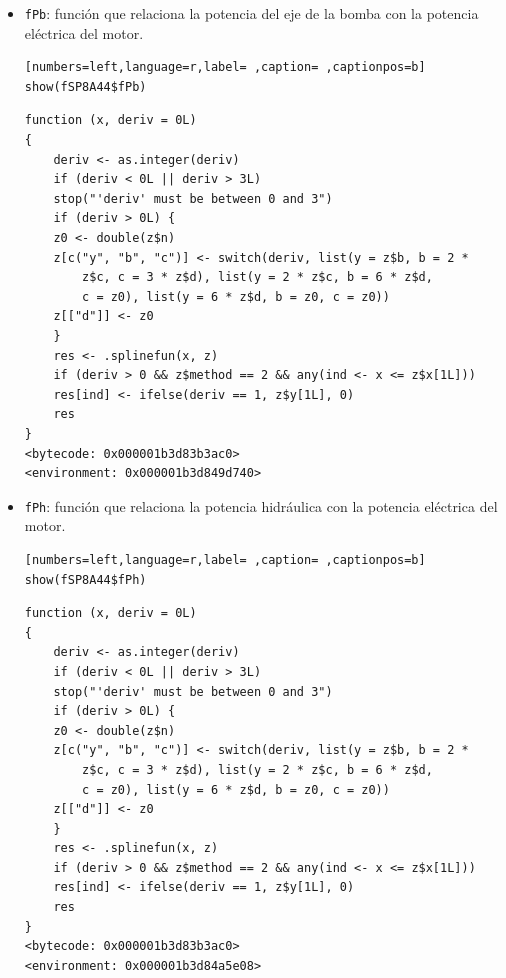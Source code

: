 \begin{itemize}
\begin{itemize}
\begin{verbatim}
function (x, deriv = 0L) 
{
    deriv <- as.integer(deriv)
    if (deriv < 0L || deriv > 3L) 
	stop("'deriv' must be between 0 and 3")
    if (deriv > 0L) {
	z0 <- double(z$n)
	z[c("y", "b", "c")] <- switch(deriv, list(y = z$b, b = 2 * 
	    z$c, c = 3 * z$d), list(y = 2 * z$c, b = 6 * z$d, 
	    c = z0), list(y = 6 * z$d, b = z0, c = z0))
	z[["d"]] <- z0
    }
    res <- .splinefun(x, z)
    if (deriv > 0 && z$method == 2 && any(ind <- x <= z$x[1L])) 
	res[ind] <- ifelse(deriv == 1, z$y[1L], 0)
    res
}
<bytecode: 0x000001b3d83b3ac0>
<environment: 0x000001b3d83be0b8>
\end{verbatim}

\item \texttt{fPb}: función que relaciona la potencia del eje de la bomba con la potencia eléctrica del motor.
\begin{lstlisting}[numbers=left,language=r,label= ,caption= ,captionpos=b]
show(fSP8A44$fPb)
\end{lstlisting}

\begin{verbatim}
function (x, deriv = 0L) 
{
    deriv <- as.integer(deriv)
    if (deriv < 0L || deriv > 3L) 
	stop("'deriv' must be between 0 and 3")
    if (deriv > 0L) {
	z0 <- double(z$n)
	z[c("y", "b", "c")] <- switch(deriv, list(y = z$b, b = 2 * 
	    z$c, c = 3 * z$d), list(y = 2 * z$c, b = 6 * z$d, 
	    c = z0), list(y = 6 * z$d, b = z0, c = z0))
	z[["d"]] <- z0
    }
    res <- .splinefun(x, z)
    if (deriv > 0 && z$method == 2 && any(ind <- x <= z$x[1L])) 
	res[ind] <- ifelse(deriv == 1, z$y[1L], 0)
    res
}
<bytecode: 0x000001b3d83b3ac0>
<environment: 0x000001b3d849d740>
\end{verbatim}

\item \texttt{fPh}: función que relaciona la potencia hidráulica con la potencia eléctrica del motor.
\begin{lstlisting}[numbers=left,language=r,label= ,caption= ,captionpos=b]
show(fSP8A44$fPh)
\end{lstlisting}

\begin{verbatim}
function (x, deriv = 0L) 
{
    deriv <- as.integer(deriv)
    if (deriv < 0L || deriv > 3L) 
	stop("'deriv' must be between 0 and 3")
    if (deriv > 0L) {
	z0 <- double(z$n)
	z[c("y", "b", "c")] <- switch(deriv, list(y = z$b, b = 2 * 
	    z$c, c = 3 * z$d), list(y = 2 * z$c, b = 6 * z$d, 
	    c = z0), list(y = 6 * z$d, b = z0, c = z0))
	z[["d"]] <- z0
    }
    res <- .splinefun(x, z)
    if (deriv > 0 && z$method == 2 && any(ind <- x <= z$x[1L])) 
	res[ind] <- ifelse(deriv == 1, z$y[1L], 0)
    res
}
<bytecode: 0x000001b3d83b3ac0>
<environment: 0x000001b3d84a5e08>
\end{verbatim}


\end{itemize}
\end{itemize}
